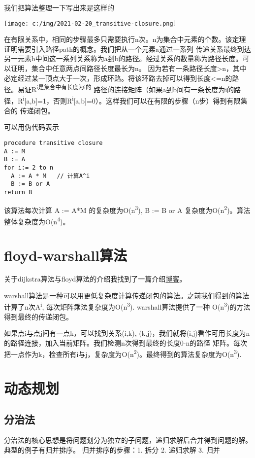 \documentclass[11pt]{article}
\begin{document}
我们把算法整理一下写出来是这样的
\begin{center}
\texttt{[image: c:/img/2021-02-20\_transitive-closure.png]}
\end{center}

在有限关系中，相同的步骤最多只需要执行n次。n为集合中元素的个数。该定理证明需要引入路径path的概念。我们把从一个元素a通过一系列
传递关系最终到达另一元素b中间这一系列关系称为a到b的路径。经过关系的数量称为路径长度。可以证明，集合中任意两点间路径长度最长为n。
因为若有一条路径长度>n，其中必定经过某一顶点大于一次，形成环路。将该环路去掉可以得到长度<=n的路径。易证R\textsuperscript{i是集合中有长度为i的}
路径的连接矩阵（如果a到b间有一条长度为i的路径，R\textsuperscript{i}[a,b]=1，否则R\textsuperscript{i}[a,b]=0）。这样我们可以在有限的步骤（n步）得到有限集合的
传递闭包。


可以用伪代码表示
\begin{verbatim}
procedure transitive closure
A := M
B := A
for i:= 2 to n
  A := A * M   // 计算A^i
  B := B or A
return B
\end{verbatim}
该算法每次计算 A := A*M  的复杂度为O(n\textsuperscript{3}), B := B or A 复杂度为O(n\textsuperscript{2})。算法整体复杂度为O(n\textsuperscript{4})。

\section{floyd-warshall算法}
\label{sec:org07d6980}
关于dijkstra算法与floyd算法的介绍我找到了一篇介绍\href{https://www.cnblogs.com/biyeymyhjob/archive/2012/07/31/2615833.html}{博客}。

warshall算法是一种可以用更低复杂度计算传递闭包的算法。之前我们得到的算法计算了n次A\textsuperscript{i}, 每次矩阵乘法复杂度为O(n\textsuperscript{3}). warshall算法提供了一种
O(n\textsuperscript{3})的方法得到最终的传递闭包。

如果点i与点j间有一点k，可以找到关系(i,k), (k,j)，我们就将(i,j)看作可用长度为n的路径连接，加入当前矩阵。我们检测n次得到最终的长度0-n的路径
矩阵。每次把一点作为k，检查所有i与j，复杂度为O(n\textsuperscript{2})。最终得到的算法复杂度为O(n\textsuperscript{3}).

\section{动态规划}
\label{sec:org381c759}
\subsection{分治法}
\label{sec:org0d5d661}
分治法的核心思想是将问题划分为独立的子问题，递归求解后合并得到问题的解。典型的例子有归并排序。
归并排序的步骤：1. 拆分 2. 递归求解 3. 归并 
\end{document}
